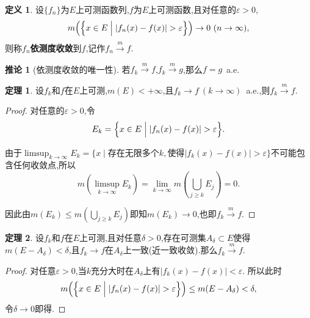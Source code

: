 \documentclass{ctexart}
\theoremstyle{definition}
\newtheorem{definition}{定义}
\newtheorem{theorem}{定理}
\newtheorem{corollary}{推论}
\theoremstyle{remark}
\begin{document}
	\begin{definition}
		设$\{f_n\}$为$E$上可测函数列,$f$为$E$上可测函数,且对任意的$\varepsilon>0$,
		$$m\Bigl(\Bigl\{x\in E\Bigm| |f_n(x)-f(x)|>\varepsilon\Bigr\}\Bigr)\to 0\ (n\to\infty),$$
		则称$f_n$\textbf{依测度收敛}到$f$,记作$f_n\xrightarrow{m} f$.
	\end{definition}
	\begin{corollary}[依测度收敛的唯一性]
		若$f_k\xrightarrow{m}f$,$f_k\xrightarrow{m}g$,那么$f=g$\ a.e.
	\end{corollary}
	
	\begin{theorem}
		设$f_k$和$f$在$E$上可测,$m(E)<+\infty$,且$f_k\to f\ (k\to\infty)$\ a.e.,则$f_k\xrightarrow{m}f$.
	\end{theorem}
	\begin{proof}
		对任意的$\varepsilon>0$,令
		$$E_k=\Bigl\{x\in E\Bigm| |f_n(x)-f(x)|>\varepsilon\Bigr\}.$$
		
		由于$\limsup_{k\to\infty}{E_k}=\{x\mid\mbox{存在无限多个}k,\mbox{使得}|f_k(x)-f(x)|>\varepsilon\}$不可能包含任何收敛点,所以
		$$m\left(\limsup_{k\to\infty}{E_k}\right)=\lim_{k\to\infty}{m\left(\bigcup_{j\ge k}{E_j}\right)}=0.$$
		
		因此由$m(E_k)\le m(\bigcup_{j\ge k}{E_j})$即知$m(E_k)\to 0$,也即$f_k\xrightarrow{m}f$.
	\end{proof}
	\begin{theorem}\label{thm_near_uniform}
		设$f_k$和$f$在$E$上可测,且对任意$\delta>0$,存在可测集$A_\delta\subset E$使得$m(E-A_\delta)<\delta$,且$f_k\to f$在$A_\delta$上一致(近一致收敛).那么$f_k\xrightarrow{m}f$.
	\end{theorem}
	\begin{proof}
		对任意$\varepsilon>0$,当$k$充分大时在$A_\delta$上有$|f_k(x)-f(x)|<\varepsilon$.
		所以此时
		$$m\Bigl(\Bigl\{x\in E\Bigm| |f_n(x)-f(x)|>\varepsilon\Bigr\}\Bigr)
		\le m(E-A_\delta)<\delta,$$
		令$\delta\to 0$即得.
	\end{proof}
	
\end{document}

